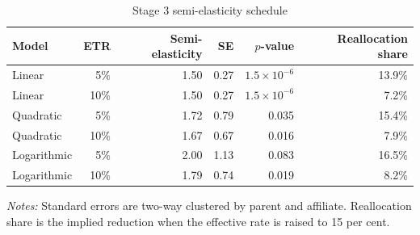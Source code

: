 \begin{table}[H]
\centering
\small
\caption[Stage 3 semi-elasticity schedule]{Stage 3 semi-elasticity schedule}
\label{tab:stage3_semielasticity}
\begin{tabular}{@{}lrrrrr@{}}
\toprule
Model & ETR & Semi-elasticity & SE & $p$-value & Reallocation share \\
\midrule
Linear &  5\% & 1.50 & 0.27 & $1.5 \times 10^{-6}$ & 13.9\% \\
Linear & 10\% & 1.50 & 0.27 & $1.5 \times 10^{-6}$ &  7.2\% \\
Quadratic &  5\% & 1.72 & 0.79 & 0.035 & 15.4\% \\
Quadratic & 10\% & 1.67 & 0.67 & 0.016 &  7.9\% \\
Logarithmic &  5\% & 2.00 & 1.13 & 0.083 & 16.5\% \\
Logarithmic & 10\% & 1.79 & 0.74 & 0.019 &  8.2\% \\
\bottomrule
\end{tabular}

\vspace{0.5em}
\begin{minipage}{0.96\textwidth}
\footnotesize\raggedright \textit{Notes:} Standard errors are two-way clustered by parent and affiliate. Reallocation share is the implied reduction when the effective rate is raised to 15 per cent.
\end{minipage}
\end{table}
